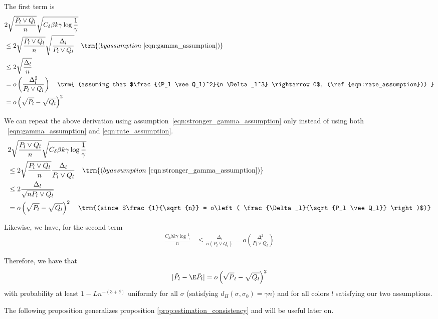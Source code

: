 \documentclass{article}
\begin{document}
The first term is
\begin{align*}
& 2 \sqrt{ \frac{P_l \vee Q_l}{n} } \sqrt{ C_\delta \beta k \gamma \log \frac{1}{\gamma}} \\
&\leq 2 \sqrt{ \frac{P_l \vee Q_l}{n} } \sqrt{ \frac{\Delta_l}{ P_l \vee Q_l }} \quad
\trm{
(by assumption~\ref{eqn:gamma_assumption})
 } \\
&\leq 2 \sqrt{ \frac{\Delta_l}{n} } \\
& = o\left( \frac{\Delta_l^2}{P_l \vee Q_l} \right) \quad \trm{
   (assuming that $\frac{(P_l \vee Q_l)^2}{n \Delta_l^3} \rightarrow 0$, 
     (\ref{eqn:rate_assumption})) 
    } \\
&= o \left( \sqrt{P_l} - \sqrt{Q_l} \right)^2 
\end{align*}

We can repeat the above derivation using assumption~\ref{eqn:stronger_gamma_assumption} only instead of using both ~\ref{eqn:gamma_assumption} and \ref{eqn:rate_assumption}.
\begin{align*}
& 2 \sqrt{ \frac{P_l \vee Q_l}{n} } \sqrt{ C_\delta \beta k \gamma \log \frac{1}{\gamma}} \\
&\leq 2 \sqrt{ \frac{P_l \vee Q_l}{n} }  \frac{\Delta_l}{ P_l \vee Q_l } \quad
\trm{ 
(by assumption~\ref{eqn:stronger_gamma_assumption})
 } \\
&\leq 2 \frac{\Delta_l}{\sqrt{ n P_l \vee Q_l}} \\
&= o \left( \sqrt{P_l} - \sqrt{Q_l} \right)^2 \quad \trm{(since 
$\frac{1}{\sqrt{n}} = o\left( \frac{\Delta_l}{\sqrt{P_l \vee Q_l}} \right)$)}
\end{align*}


Likewise, we have, for the second term
\begin{align*}
  \frac{C_\delta \beta k \gamma \log \frac{1}{\gamma}}{n}  &\leq
 \frac{\Delta_l}{n (P_l \vee Q_l)} = o \left( \frac{\Delta_l^2}{P_l \vee Q_l} \right)
\end{align*}

Therefore, we have that
\begin{align}
| \hat{P}_l - \E \hat{P}_l | = o \left( \sqrt{P}_l - \sqrt{Q_l} \right)^2
\label{eqn:Pl_variance}
\end{align}
with probability at least $1 - L n^{-(3+\delta)}$ uniformly for all $\sigma$ (satisfying $d_H(\sigma, \sigma_0) = \gamma n$) and for all colors $l$ satisfying our two assumptions.

The following proposition generalizes proposition \ref{prop:estimation_consistency} and will be useful later on.
\end{document}
